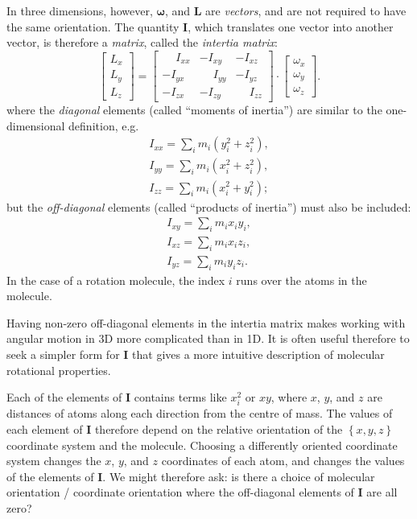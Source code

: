 \documentclass[a4paper]{article}
\newcommand{\bvec}[1]{\boldsymbol{\mathbf{#1}}}
\begin{document}
In three dimensions, however, $\bvec{\omega}$, and $\bvec{L}$ are \emph{vectors}, and are not required to have the same orientation. The quantity $\bvec{I}$, which translates one vector into another vector, is therefore a \emph{matrix}, called the \emph{intertia matrix}:
\begin{equation*}
\begin{bmatrix}L_x\\L_y\\L_z\end{bmatrix} = 
\begin{bmatrix} 
\phantom{-}I_{xx} & -I_{xy} & -I_{xz} \\
-I_{yx} & \phantom{-}I_{yy} & -I_{yz} \\
-I_{zx} & -I_{zy} & \phantom{-}I_{zz} 
\end{bmatrix}
\cdot
\begin{bmatrix}\omega_x\\\omega_y\\\omega_z\end{bmatrix}.
\end{equation*}
where the \emph{diagonal} elements (called ``moments of inertia'') are similar to the one-dimensional definition, e.g.
\begin{eqnarray*}
I_{xx} = \sum_i m_i(y_i^2+z_i^2), \\
I_{yy} = \sum_i m_i(x_i^2+z_i^2), \\
I_{zz} = \sum_i m_i(x_i^2+y_i^2);
\end{eqnarray*}
but the \emph{off-diagonal} elements (called ``products of inertia'') must also be included:
\begin{eqnarray*}
I_{xy} = \sum_i m_ix_iy_i, \\
I_{xz} = \sum_i m_ix_iz_i, \\
I_{yz} = \sum_i m_iy_iz_i.
\end{eqnarray*}
In the case of a rotation molecule, the index $i$ runs over the atoms in the molecule.

Having non-zero off-diagonal elements in the intertia matrix makes working with angular motion in 3D more complicated than in 1D. It is often useful therefore to seek a simpler form for $\bvec{I}$ that gives a more intuitive description of molecular rotational properties.

Each of the elements of $\bvec{I}$ contains terms like 
$x_i^2$ 
or $xy$, where $x$, $y$, and $z$ are distances of atoms along each direction from the centre of mass. The values of each element of $\bvec{I}$ therefore depend on the relative orientation of the $\left\{x,y,z\right\}$ coordinate system and the molecule. Choosing a differently oriented coordinate system changes the $x$, $y$, and $z$ coordinates of each atom, and changes the values of the elements of $\bvec{I}$. We might therefore ask: is there a choice of molecular orientation / coordinate orientation where the off-diagonal elements of $\bvec{I}$ are all zero?
\end{document}
